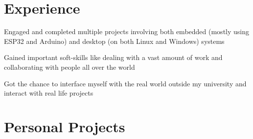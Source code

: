 \documentclass[]{plushcv}
\begin{document}
\begin{minipage}[t]{0.60\textwidth}



  \section{Experience}
  \vspace{\topsep} %
  \begin{tightemize}
    \sectionsep
    \item Engaged and completed multiple projects involving both embedded (mostly using ESP32 and Arduino)
    and desktop (on both Linux and Windows) systems
    \item Gained important soft-skills like dealing with a vast amount of work and collaborating with people all
    over the world
    \item Got the chance to interface myself with the real world outside my university and interact with real life
    projects
  \end{tightemize}
  \sectionsep



  \section{Personal Projects}


\end{minipage}
\end{document}
